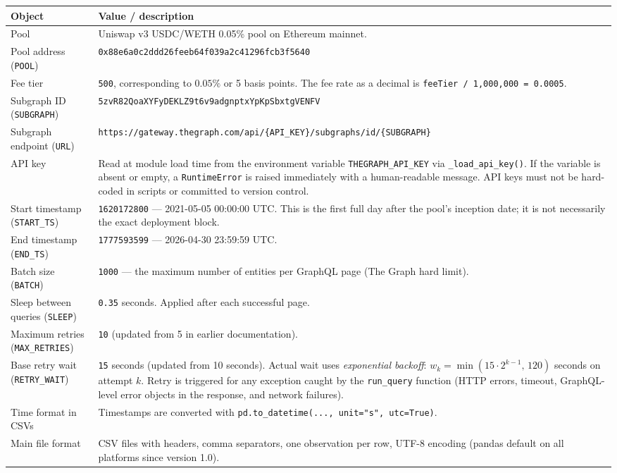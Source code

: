 \documentclass[11pt,a4paper]{article}
\begin{document}
\begin{xltabular}{\linewidth}{L{4.3cm}Y}
\toprule
\textbf{Object} & \textbf{Value / description} \\
\midrule
Pool & Uniswap v3 USDC/WETH 0.05\% pool on Ethereum mainnet. \\
Pool address (\texttt{POOL}) & \texttt{0x88e6a0c2ddd26feeb64f039a2c41296fcb3f5640} \\
Fee tier & \texttt{500}, corresponding to $0.05\%$ or 5 basis points. The
           fee rate as a decimal is \texttt{feeTier / 1{,}000{,}000 = 0.0005}. \\
Subgraph ID (\texttt{SUBGRAPH}) &
  \texttt{5zvR82QoaXYFyDEKLZ9t6v9adgnptxYpKpSbxtgVENFV} \\
Subgraph endpoint (\texttt{URL}) &
  \texttt{https://gateway.thegraph.com/api/\{API\_KEY\}/subgraphs/id/\{SUBGRAPH\}} \\
API key & Read at module load time from the environment variable
          \texttt{THEGRAPH\_API\_KEY} via \texttt{\_load\_api\_key()}.
          If the variable is absent or empty, a \texttt{RuntimeError} is
          raised immediately with a human-readable message. API keys must
          not be hard-coded in scripts or committed to version control. \\
Start timestamp (\texttt{START\_TS}) &
  \texttt{1620172800} --- 2021-05-05 00:00:00 UTC.
  This is the first full day after the pool's inception date; it is not
  necessarily the exact deployment block. \\
End timestamp (\texttt{END\_TS}) &
  \texttt{1777593599} --- 2026-04-30 23:59:59 UTC. \\
Batch size (\texttt{BATCH}) &
  \texttt{1000} --- the maximum number of entities per GraphQL page
  (The Graph hard limit). \\
Sleep between queries (\texttt{SLEEP}) &
  \texttt{0.35} seconds. Applied after each successful page. \\
Maximum retries (\texttt{MAX\_RETRIES}) & \texttt{10} (updated from 5 in
  earlier documentation). \\
Base retry wait (\texttt{RETRY\_WAIT}) & \texttt{15} seconds (updated from
  10 seconds). Actual wait uses \emph{exponential backoff}:
  $w_k = \min(15 \cdot 2^{k-1},\, 120)$ seconds on attempt $k$.
  Retry is triggered for any exception caught by the \texttt{run\_query}
  function (HTTP errors, timeout, GraphQL-level error objects in the
  response, and network failures). \\
Time format in CSVs &
  Timestamps are converted with
  \texttt{pd.to\_datetime(..., unit="s", utc=True)}. \\
Main file format &
  CSV files with headers, comma separators, one observation per row,
  UTF-8 encoding (pandas default on all platforms since version 1.0). \\
\bottomrule
\end{xltabular}
\end{document}
